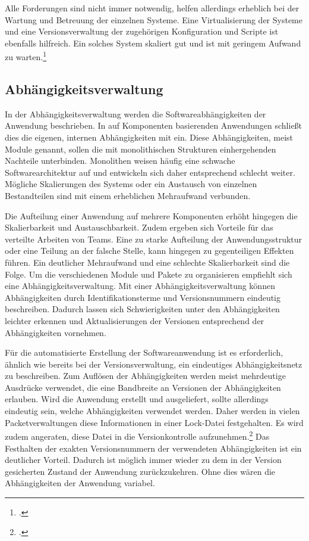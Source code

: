 Alle Forderungen sind nicht immer notwendig, helfen allerdings erheblich bei der Wartung und Betreuung der einzelnen Systeme. 
Eine Virtualisierung der Systeme und eine Versionsverwaltung der zugehörigen Konfiguration und Scripte ist ebenfalls 
hilfreich. Ein solches System skaliert gut und ist mit geringem Aufwand zu warten.\footcite[vgl.][]{humble2010}

\subsection{Abhängigkeitsverwaltung}
\label{subsec:dependency-management}

In der Abhängigkeitsverwaltung werden die Softwareabhängigkeiten der Anwendung beschrieben. In auf  Komponenten 
basierenden Anwendungen schließt dies die eigenen, internen Abhängigkeiten mit ein. Diese Abhängigkeiten, meist Module 
genannt, sollen die mit monolithischen Strukturen einhergehenden Nachteile unterbinden. Monolithen weisen häufig eine 
schwache Softwarearchitektur auf und entwickeln sich daher entsprechend schlecht weiter. Mögliche Skalierungen des 
Systems oder ein Austausch von einzelnen Bestandteilen sind mit einem erheblichen Mehraufwand verbunden.

Die Aufteilung einer Anwendung auf mehrere Komponenten erhöht hingegen die Skalierbarkeit und Austauschbarkeit. Zudem 
ergeben sich Vorteile für das verteilte Arbeiten von Teams. 
Eine zu starke Aufteilung der Anwendungsstruktur oder eine Teilung an der falsche Stelle, kann hingegen zu gegenteiligen 
Effekten führen. Ein deutlicher Mehraufwand und eine schlechte Skalierbarkeit sind die Folge. Um die verschiedenen Module 
und Pakete zu organisieren empfiehlt sich eine Abhängigkeitsverwaltung. Mit einer Abhängigkeitsverwaltung können Abhängigkeiten durch Identifikationsterme und Versionsnummern eindeutig beschreiben. Dadurch lassen sich Schwierigkeiten unter den Abhängigkeiten leichter erkennen und Aktualisierungen der Versionen entsprechend der Abhängigkeiten vornehmen.

Für die automatisierte Erstellung der Softwareanwendung ist es erforderlich, ähnlich wie bereits bei der 
Versionsverwaltung, ein eindeutiges Abhängigkeitsnetz zu beschreiben. Zum Auflösen der Abhängigkeiten werden meist 
mehrdeutige Ausdrücke verwendet, die eine Bandbreite an Versionen der Abhängigkeiten erlauben. Wird die Anwendung 
erstellt und ausgeliefert, sollte allerdings eindeutig sein, welche Abhängigkeiten verwendet werden. Daher werden in 
vielen Packetverwaltungen diese Informationen in einer Lock-Datei festgehalten. Es wird zudem angeraten, diese Datei in 
die Versionkontrolle aufzunehmen.\footcite[vgl.][]{composer-why-lock-in-vcs} Das Festhalten der exakten Versionsnummern der verwendeten Abhängigkeiten ist ein deutlicher Vorteil. Dadurch ist möglich immer wieder zu dem in der Version gesicherten Zustand der Anwendung zurückzukehren. Ohne dies wären die Abhängigkeiten der Anwendung variabel.

